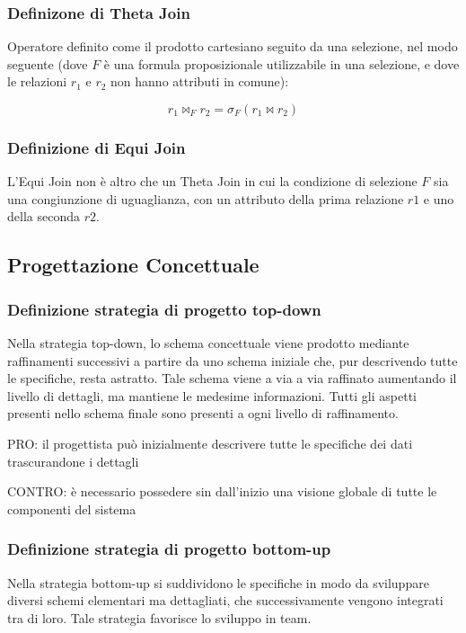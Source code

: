 \subsubsection{Definizone di Theta Join}
Operatore definito come il prodotto cartesiano seguito da una selezione, nel modo seguente
(dove $F$ è una formula proposizionale utilizzabile in una selezione, e dove le relazioni
$r_1$ e $r_2$ non hanno attributi in comune):

\begin{displaymath}
  r_1 \bowtie_{F} r_2 = \sigma_{F}(r_1 \bowtie r_2)
\end{displaymath}

\subsubsection{Definizione di Equi Join}
L'Equi Join non è altro che un Theta Join in cui la condizione di selezione $F$
sia una congiunzione di uguaglianza, con un attributo della prima relazione $r1$
e uno della seconda $r2$.

\subsection{Progettazione Concettuale}
\subsubsection{Definizione strategia di progetto top-down}

Nella strategia top-down, lo schema concettuale viene prodotto mediante raffinamenti
successivi a partire da uno schema iniziale che, pur descrivendo tutte le specifiche,
resta astratto. Tale schema viene a via a via raffinato aumentando il livello di dettagli,
ma mantiene le medesime informazioni. Tutti gli aspetti presenti nello schema finale
sono presenti a ogni livello di raffinamento.

\noindent
PRO: il progettista può inizialmente descrivere tutte le specifiche dei dati
trascurandone i dettagli

\noindent
CONTRO: è necessario possedere sin dall'inizio una visione globale di tutte le componenti
del sistema

\subsubsection{Definizione strategia di progetto bottom-up}

Nella strategia bottom-up si suddividono le specifiche in modo da sviluppare
diversi schemi elementari ma dettagliati, che successivamente vengono integrati
tra di loro. Tale strategia favorisce lo sviluppo in team.
